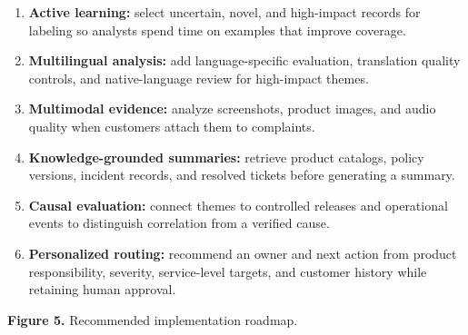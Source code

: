 \documentclass[11pt,a4paper,twoside]{article}
\begin{document}
\begin{enumerate}
  \item \textbf{Active learning:} select uncertain, novel, and high-impact records for labeling so analysts spend time on examples that improve coverage.
  \item \textbf{Multilingual analysis:} add language-specific evaluation, translation quality controls, and native-language review for high-impact themes.
  \item \textbf{Multimodal evidence:} analyze screenshots, product images, and audio quality when customers attach them to complaints.
  \item \textbf{Knowledge-grounded summaries:} retrieve product catalogs, policy versions, incident records, and resolved tickets before generating a summary.
  \item \textbf{Causal evaluation:} connect themes to controlled releases and operational events to distinguish correlation from a verified cause.
  \item \textbf{Personalized routing:} recommend an owner and next action from product responsibility, severity, service-level targets, and customer history while retaining human approval.
\end{enumerate}

\begin{center}

\vspace{0.1em}
{\small\textbf{Figure 5.} Recommended implementation roadmap.}
\end{center}
\end{document}
